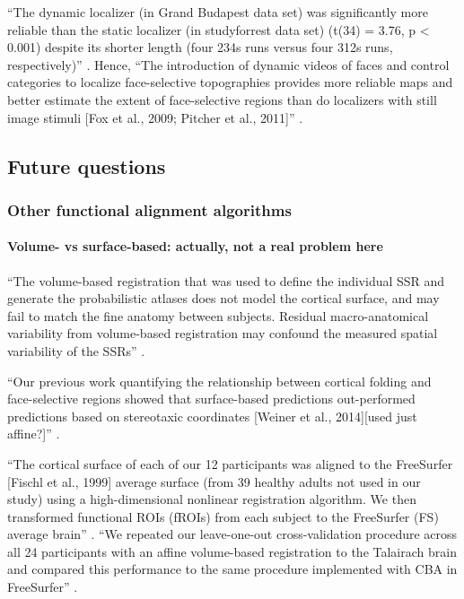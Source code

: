 ``The dynamic localizer (in Grand Budapest data set) was significantly more
reliable than the static localizer (in studyforrest data set) (t(34) = 3.76, p <
0.001) despite its shorter length (four 234s runs versus four 312s runs,
respectively)'' \citep{jiahui2020predicting}.
%
Hence, ``The introduction of dynamic videos of faces and control categories to
localize face-selective topographies provides more reliable maps and better
estimate the extent of face-selective regions than do localizers with still
image stimuli [Fox et al., 2009; Pitcher et al., 2011]''
\citep{jiahui2020predicting}.


\subsection{Future questions}


\subsubsection{Other functional alignment algorithms}

\paragraph{Volume- vs surface-based: actually, not a real problem here}



``The volume-based registration that was used to define the individual SSR and
generate the probabilistic atlases does not model the cortical surface,
and may fail to match the fine anatomy between subjects.
%
Residual macro-anatomical variability from volume-based registration may
confound the measured spatial variability of the SSRs''
\citep{zhen2017quantifying}.


``Our previous work quantifying the relationship between cortical folding and
face-selective regions showed that surface-based predictions out-performed
predictions based on stereotaxic coordinates [Weiner et al., 2014][used just
affine?]'' \citep{weiner2018defining}.

``The cortical surface of each of our 12 participants was aligned to the
FreeSurfer [Fischl et al., 1999] average surface (from 39 healthy adults not
used in our study) using a high-dimensional nonlinear registration algorithm.
%
We then transformed functional ROIs (fROIs) from each subject to the FreeSurfer
(FS) average brain'' \citep{weiner2018defining}.
%
``We repeated our leave-one-out cross-validation procedure across all 24
participants with an affine volume-based registration to the Talairach brain and
compared this performance to the same procedure implemented with CBA in
FreeSurfer'' \citep{weiner2018defining}.

